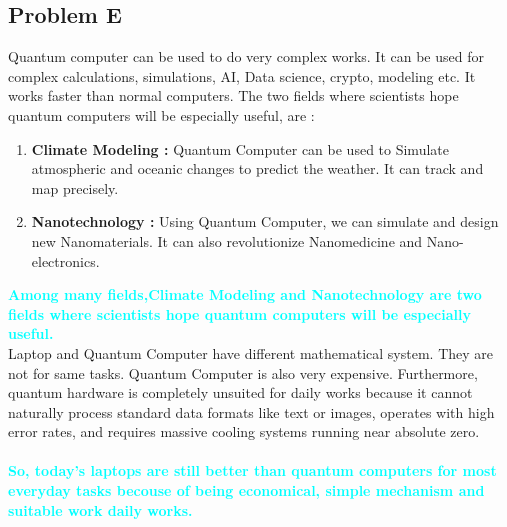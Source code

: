\documentclass[14pt]{article}
\begin{document}
\begin{center}
    \section*{\textcolor{goldColor}{\textbf{ Problem E }}}
\end{center} 

Quantum computer can be used to do very complex works. It can be used for complex calculations, simulations, AI, Data science, crypto, modeling etc. It works faster than normal computers. The two fields where scientists hope quantum computers will be especially useful, are :

\begin{enumerate}
    \item \textbf{Climate Modeling : }Quantum Computer can be used to Simulate atmospheric and oceanic changes to predict the weather. It can track and map precisely.
    \item \textbf{Nanotechnology : }Using Quantum Computer, we can simulate and design new Nanomaterials. It can also revolutionize Nanomedicine and Nano-electronics.
\end{enumerate}
\textcolor{cyan}{\textbf{Among many fields,Climate Modeling and Nanotechnology are two fields where scientists hope quantum computers will be especially useful.}}\\

Laptop and Quantum Computer have different mathematical system. They are not for same tasks. Quantum Computer is also very expensive. Furthermore, quantum hardware is completely unsuited for daily works because it cannot naturally process standard data formats like text or images, operates with high error rates, and requires massive cooling systems running near absolute zero.\\\\
\textcolor{cyan}{\textbf{So, today’s laptops are still better than quantum computers for most everyday tasks becouse of being economical, simple mechanism and suitable work daily works.}}
\end{document}
